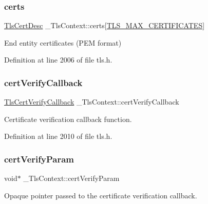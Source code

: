 \subsubsection{\texorpdfstring{certs}{certs}}
{\footnotesize\ttfamily \hyperlink{structTlsCertDesc}{Tls\+Cert\+Desc} \+\_\+\+Tls\+Context\+::certs\mbox{[}\hyperlink{tls__config_8h_a23af217ea8d64e790e6e1e4bca07e2c5}{T\+L\+S\+\_\+\+M\+A\+X\+\_\+\+C\+E\+R\+T\+I\+F\+I\+C\+A\+T\+ES}\mbox{]}}



End entity certificates (P\+EM format) 



Definition at line 2006 of file tls.\+h.

\mbox{\label{struct__TlsContext_ab278e0e4f013057c3590f397611708b9}} 
\subsubsection{\texorpdfstring{cert\+Verify\+Callback}{certVerifyCallback}}
{\footnotesize\ttfamily \hyperlink{tls_8h_a1d220d8b5abc08e3ce8a1278d2aeac5e}{Tls\+Cert\+Verify\+Callback} \+\_\+\+Tls\+Context\+::cert\+Verify\+Callback}



Certificate verification callback function. 



Definition at line 2010 of file tls.\+h.

\mbox{\label{struct__TlsContext_af49da4a70505db68971fdf90c8ce802b}} 
\subsubsection{\texorpdfstring{cert\+Verify\+Param}{certVerifyParam}}
{\footnotesize\ttfamily void$\ast$ \+\_\+\+Tls\+Context\+::cert\+Verify\+Param}



Opaque pointer passed to the certificate verification callback. 



